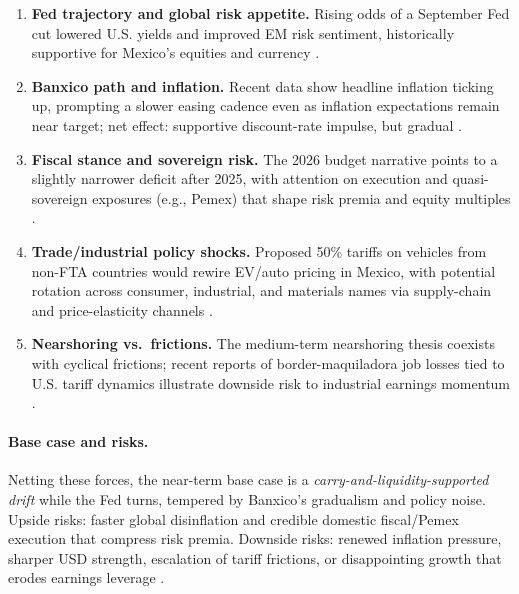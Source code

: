 \documentclass[10pt,a4paper]{article} %
\begin{document}
\begin{enumerate}
    \item \textbf{Fed trajectory and global risk appetite.} Rising odds of a September Fed cut lowered U.S. yields and improved EM risk sentiment, historically supportive for Mexico’s equities and currency \citep{reuters_ipc_record_2025}.
    \item \textbf{Banxico path and inflation.} Recent data show headline inflation ticking up, prompting a slower easing cadence even as inflation expectations remain near target; net effect: supportive discount-rate impulse, but gradual \citep{bloomberg_mx_inflation_2025,mnd_inflation_band_2025}.
    \item \textbf{Fiscal stance and sovereign risk.} The 2026 budget narrative points to a slightly narrower deficit after 2025, with attention on execution and quasi-sovereign exposures (e.g., Pemex) that shape risk premia and equity multiples \citep{reuters_budget_2025,reuters_pemex_plan_2025}.
    \item \textbf{Trade/industrial policy shocks.} Proposed 50\% tariffs on vehicles from non-FTA countries would rewire EV/auto pricing in Mexico, with potential rotation across consumer, industrial, and materials names via supply-chain and price-elasticity channels \citep{reuters_tariffs_china_autos_2025}.
    \item \textbf{Nearshoring vs.\ frictions.} The medium-term nearshoring thesis coexists with cyclical frictions; recent reports of border-maquiladora job losses tied to U.S. tariff dynamics illustrate downside risk to industrial earnings momentum \citep{reuters_border_jobs_2025}.
\end{enumerate}

\paragraph{Base case and risks.}
Netting these forces, the near-term base case is a \emph{carry-and-liquidity-supported drift} while the Fed turns, tempered by Banxico’s gradualism and policy noise. Upside risks: faster global disinflation and credible domestic fiscal/Pemex execution that compress risk premia. Downside risks: renewed inflation pressure, sharper USD strength, escalation of tariff frictions, or disappointing growth that erodes earnings leverage \citep{reuters_ipc_record_2025,bloomberg_mx_inflation_2025,reuters_budget_2025,reuters_pemex_plan_2025,reuters_tariffs_china_autos_2025}.
\end{document}
